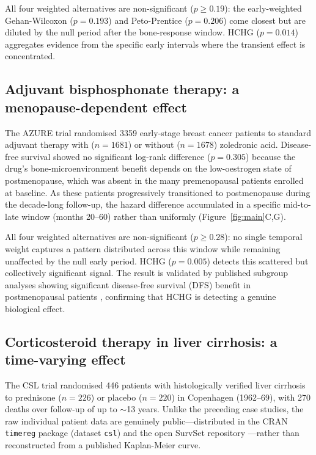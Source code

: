 \documentclass[unnumsec,webpdf,contemporary,large]{oup-authoring-template}
\begin{document}
All four weighted alternatives are non-significant ($p \geq 0.19$):
the early-weighted Gehan-Wilcoxon ($p = 0.193$) and Peto-Prentice
($p = 0.206$) come closest but are diluted by the null period after
the bone-response window. HCHG ($p = 0.014$) aggregates evidence from the specific early intervals
where the transient effect is concentrated.

\subsection*{Adjuvant bisphosphonate therapy: a menopause-dependent effect}

The AZURE trial \citep{coleman2011,coleman2014} randomised 3359 early-stage
breast cancer patients to standard adjuvant therapy with ($n=1681$) or
without ($n=1678$) zoledronic acid. Disease-free survival showed no
significant log-rank difference ($p = 0.305$) because the drug's
bone-microenvironment benefit depends on the low-oestrogen state of
postmenopause, which was absent in the many premenopausal patients
enrolled at baseline. As these patients progressively transitioned to
postmenopause during the decade-long follow-up, the hazard difference
accumulated in a specific mid-to-late window (months 20--60) rather than
uniformly (Figure~\ref{fig:main}C,G).

All four weighted alternatives are non-significant ($p \geq 0.28$):
no single temporal weight captures a pattern distributed across this
window while remaining unaffected by the null early period. HCHG
($p = 0.005$) detects this scattered but collectively significant signal.
The result is validated by published subgroup analyses showing significant disease-free survival (DFS) benefit in postmenopausal patients \citep{coleman2011,coleman2014},
confirming that HCHG is detecting a genuine biological effect.

\subsection*{Corticosteroid therapy in liver cirrhosis: a time-varying effect}

The CSL trial \citep{csl_data} randomised 446 patients with histologically
verified liver cirrhosis to prednisone ($n=226$) or placebo ($n=220$) in
Copenhagen (1962--69), with 270 deaths over follow-up of up to
$\sim$13 years. Unlike the preceding case studies, the raw individual
patient data are genuinely public---distributed in the CRAN \texttt{timereg}
package (dataset \texttt{csl}) and the open SurvSet repository
\citep{survset2022}---rather than reconstructed from a published
Kaplan-Meier curve.
\end{document}
